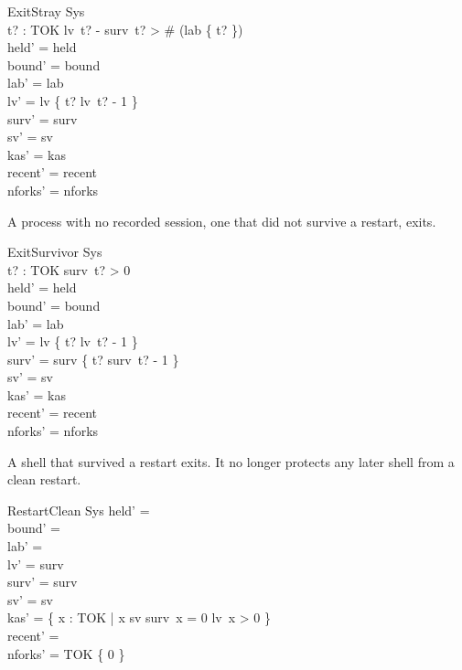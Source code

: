 \documentclass[a4paper,10pt,fleqn]{article}
\begin{document}
\begin{schema}{ExitStray}
  \Delta Sys \\
  t? : TOK
\where
  lv~t? - surv~t? > \# (lab \rres \{ t? \}) \\
  held' = held \\
  bound' = bound \\
  lab' = lab \\
  lv' = lv \oplus \{ t? \mapsto lv~t? - 1 \} \\
  surv' = surv \\
  sv' = sv \\
  kas' = kas \\
  recent' = recent \\
  nforks' = nforks
\end{schema}

A process with no recorded session, one that did not survive a restart, exits.

\begin{schema}{ExitSurvivor}
  \Delta Sys \\
  t? : TOK
\where
  surv~t? > 0 \\
  held' = held \\
  bound' = bound \\
  lab' = lab \\
  lv' = lv \oplus \{ t? \mapsto lv~t? - 1 \} \\
  surv' = surv \oplus \{ t? \mapsto surv~t? - 1 \} \\
  sv' = sv \\
  kas' = kas \\
  recent' = recent \\
  nforks' = nforks
\end{schema}

A shell that survived a restart exits. It no longer protects any later shell from a clean restart.

\begin{schema}{RestartClean}
  \Delta Sys
\where
  held' = \emptyset \\
  bound' = \emptyset \\
  lab' = \emptyset \\
  lv' = surv \\
  surv' = surv \\
  sv' = sv \\
  kas' = \{ x : TOK | x \in sv \land surv~x = 0 \land lv~x > 0 \} \\
  recent' = \langle \rangle \\
  nforks' = TOK \cross \{ 0 \}
\end{schema}
\end{document}
